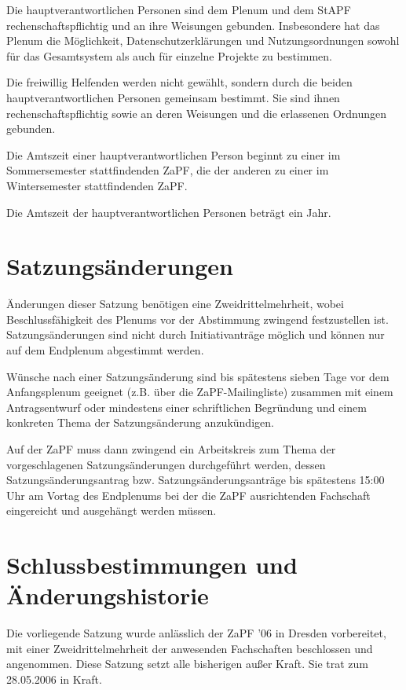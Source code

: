 \documentclass[
  a4paper,
  oneside]{scrartcl}
\begin{document}
Die hauptverantwortlichen Personen sind dem Plenum und dem StAPF
rechenschaftspflichtig und an ihre Weisungen gebunden. Insbesondere hat
das Plenum die Möglichkeit, Datenschutzerklärungen und Nutzungsordnungen
sowohl für das Gesamtsystem als auch für einzelne Projekte zu bestimmen.

Die freiwillig Helfenden werden nicht gewählt, sondern durch die beiden
hauptverantwortlichen Personen gemeinsam bestimmt. Sie sind ihnen
rechenschaftspflichtig sowie an deren Weisungen und die erlassenen
Ordnungen gebunden.

Die Amtszeit einer hauptverantwortlichen Person beginnt zu einer im
Sommersemester stattfindenden ZaPF, die der anderen zu einer im
Wintersemester stattfindenden ZaPF.

Die Amtszeit der hauptverantwortlichen Personen beträgt ein Jahr.

\section{Satzungsänderungen}\label{satzungsuxe4nderungen}

Änderungen dieser Satzung benötigen eine Zweidrittelmehrheit, wobei
Beschlussfähigkeit des Plenums vor der Abstimmung zwingend festzustellen
ist. Satzungsänderungen sind nicht durch Initiativanträge möglich und
können nur auf dem Endplenum abgestimmt werden.

Wünsche nach einer Satzungsänderung sind bis spätestens sieben Tage vor
dem Anfangsplenum geeignet (z.B. über die ZaPF-Mailingliste) zusammen
mit einem Antragsentwurf oder mindestens einer schriftlichen Begründung
und einem konkreten Thema der Satzungsänderung anzukündigen.

Auf der ZaPF muss dann zwingend ein Arbeitskreis zum Thema der
vorgeschlagenen Satzungsänderungen durchgeführt werden, dessen
Satzungsänderungsantrag bzw. Satzungsänderungsanträge bis spätestens
15:00 Uhr am Vortag des Endplenums bei der die ZaPF ausrichtenden
Fachschaft eingereicht und ausgehängt werden müssen.

\section*{Schlussbestimmungen und
Änderungshistorie}\label{schlussbestimmungen-und-uxe4nderungshistorie}

Die vorliegende Satzung wurde anlässlich der ZaPF '06 in Dresden
vorbereitet, mit einer Zweidrittelmehrheit der anwesenden Fachschaften
beschlossen und angenommen. Diese Satzung setzt alle bisherigen außer
Kraft. Sie trat zum 28.05.2006 in Kraft.
\end{document}
